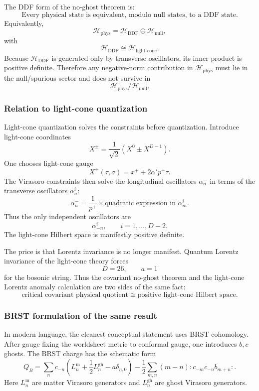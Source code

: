 \documentclass[
  10pt,
  a4paper,
  openany]{book}
\begin{document}
The DDF form of the no-ghost theorem is: \[
\boxed{
\text{Every physical state is equivalent, modulo null states, to a DDF state.}
}
\] Equivalently, \[
\mathcal H_{\text{phys}}
=
\mathcal H_{\text{DDF}}
\oplus
\mathcal H_{\text{null}},
\] with \[
\mathcal H_{\text{DDF}}
\cong
\mathcal H_{\text{light-cone}}.
\] Because \(\mathcal H_{\text{DDF}}\) is generated only by transverse
oscillators, its inner product is positive definite. Therefore any
negative-norm contribution in \(\mathcal H_{\text{phys}}\) must lie in
the null/spurious sector and does not survive in \[
\mathcal H_{\text{phys}}/\mathcal H_{\text{null}}.
\]

\subsubsection{Relation to light-cone
quantization}\label{relation-to-light-cone-quantization}

Light-cone quantization solves the constraints before quantization.
Introduce light-cone coordinates \[
X^\pm
=
\frac{1}{\sqrt{2}}(X^0\pm X^{D-1}).
\] One chooses light-cone gauge \[
X^+(\tau,\sigma)=x^+ + 2\alpha' p^+\tau.
\] The Virasoro constraints then solve the longitudinal oscillators
\(\alpha_n^-\) in terms of the transverse oscillators \(\alpha_n^i\): \[
\alpha_n^-
=
\frac{1}{p^+}\times
\text{quadratic expression in }\alpha_m^i.
\] Thus the only independent oscillators are \[
\alpha_{-n}^i,
\qquad
i=1,\dots,D-2.
\] The light-cone Hilbert space is manifestly positive definite.

The price is that Lorentz invariance is no longer manifest. Quantum
Lorentz invariance of the light-cone theory forces \[
D=26,
\qquad
a=1
\] for the bosonic string. Thus the covariant no-ghost theorem and the
light-cone Lorentz anomaly calculation are two sides of the same fact:
\[
\text{critical covariant physical quotient}
\cong
\text{positive light-cone Hilbert space}.
\]

\subsubsection{BRST formulation of the same
result}\label{brst-formulation-of-the-same-result}

In modern language, the cleanest conceptual statement uses BRST
cohomology. After gauge fixing the worldsheet metric to conformal gauge,
one introduces \(b,c\) ghosts. The BRST charge has the schematic form \[
Q_B
=
\sum_n c_{-n}\left(L_n^{\text{m}}+\frac{1}{2}L_n^{\text{gh}}-a\delta_{n,0}\right)
-
\frac{1}{2}\sum_{m,n}(m-n):c_{-m}c_{-n}b_{m+n}:.
\] Here \(L_n^{\text{m}}\) are matter Virasoro generators and
\(L_n^{\text{gh}}\) are ghost Virasoro generators.
\end{document}
